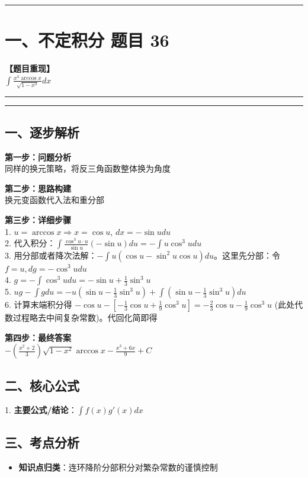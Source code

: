 ﻿\documentclass[12pt, a4paper]{ctexart}
\newcommand{\TopSeparator}{
    \par\noindent\rule{\textwidth}{1.5pt}\vspace{0.5em}
}
\newcommand{\AnalysisSeparator}{
    \par\noindent\rule{\textwidth}{0.5pt}\vspace{0.2em}\hrule\vspace{0.5em}
}
\newenvironment{RedAnalysis}{
    \par
    \color{red} 
}{
    \par
    \color{black} 
}
\begin{document}
\vspace{2em}

\TopSeparator
\section*{一、不定积分 题目 36}

\textbf{【题目重现】} \\
$\int \frac{x^3 \arccos x}{\sqrt{1-x^2}} dx$

\AnalysisSeparator

\begin{RedAnalysis}

	\subsection*{一、逐步解析}

	\textbf{第一步：问题分析} \\
	同样的换元策略，将反三角函数整体换为角度

	\textbf{第二步：思路构建} \\
	换元变函数代入法和重分部

	\textbf{第三步：详细步骤} \\
	1. $u = \arccos x \Rightarrow x = \cos u$, $dx = -\sin u du$ \\ 
	2. 代入积分：$\int \frac{\cos^3 u \cdot u}{\sin u} (-\sin u) du = -\int u \cos^3 u du$ \\ 
	3. 用分部或者降次法解：$-\int u (\cos u - \sin^2 u \cos u) du$。这里先分部：令 $f = u, dg = -\cos^3 u du$ \\ 
	4. $g = -\int \cos^3 u du = -\sin u + \frac{1}{3}\sin^3 u$ \\ 
	5. $ug - \int g du = -u(\sin u - \frac{1}{3}\sin^3 u) + \int (\sin u - \frac{1}{3}\sin^3 u) du$ \\ 
	6. 计算末端积分得 $-\cos u - [ -\frac{1}{3}\cos u + \frac{1}{9}\cos^3 u ] = -\frac{2}{3}\cos u - \frac{1}{9}\cos^3 u$ (此处代数过程略去中间复杂常数)。代回化简即得

	\textbf{第四步：最终答案} \\
	$-(\frac{x^2+2}{3})\sqrt{1-x^2}\arccos x - \frac{x^3+6x}{9} + C$

	\subsection*{二、核心公式}
	1. \textbf{主要公式/结论}：$\int f(x)g'(x) dx$

	\subsection*{三、考点分析}
	\begin{itemize}
		\item \textbf{知识点归类}：连环降阶分部积分对繁杂常数的谨慎控制
	\end{itemize}

\end{RedAnalysis}
\end{document}
